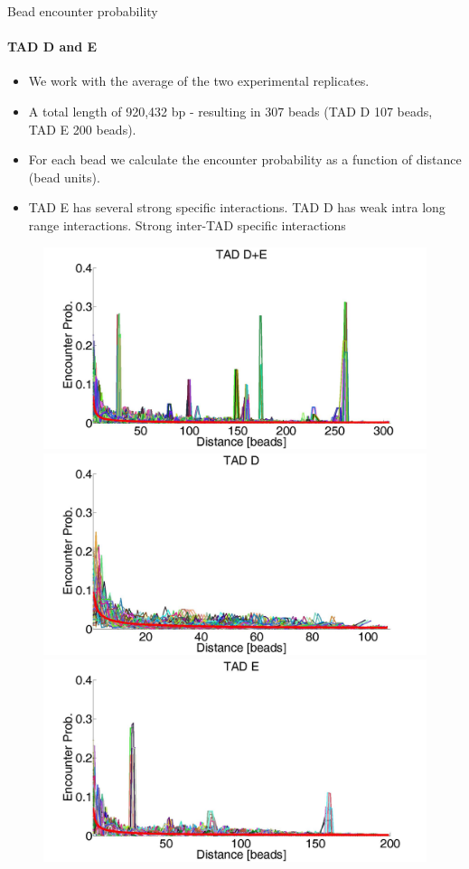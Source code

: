 \documentclass[8pt]{beamer}
\begin{document}
\begin{frame}{Bead encounter probability}
\framesubtitle{TAD D and E}
\begin{itemize}
\item We work with the average of the two experimental replicates.
\item A total length of 920,432 bp - resulting in 307 beads (TAD D 107 beads, TAD E 200 beads).
\item For each bead we calculate the encounter probability as a function of distance (bead units).
\item TAD E has several strong specific interactions. TAD D has weak intra long range interactions. Strong inter-TAD specific interactions
\end{itemize}

\begin{figure}[H]\label{TADDAndEencounterProb}
\centering
\includegraphics[scale=0.078]{encounterProbabilityTADDAndE}
\includegraphics[scale=0.075]{encounterProbabilityTADD}
\includegraphics[scale=0.075]{encounterProbabilityTADE}
\end{figure}
\end{frame}
\end{document}
